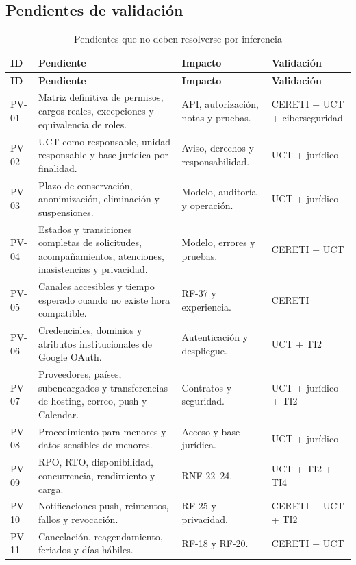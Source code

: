 \documentclass[10pt,a4paper,oneside]{article}
\begin{document}
\subsection{Pendientes de validación}

\scriptsize
\begin{longtable}{@{}L{0.07\textwidth}L{0.40\textwidth}L{0.24\textwidth}L{0.20\textwidth}@{}}
\caption{Pendientes que no deben resolverse por inferencia}\label{tab:pend-sintesis}\\
\toprule\textbf{ID} & \textbf{Pendiente} & \textbf{Impacto} & \textbf{Validación}\\\midrule
\endfirsthead\toprule\textbf{ID} & \textbf{Pendiente} & \textbf{Impacto} & \textbf{Validación}\\\midrule\endhead
\bottomrule\endfoot
PV-01 & Matriz definitiva de permisos, cargos reales, excepciones y equivalencia de roles. & API, autorización, notas y pruebas. & CERETI + UCT + ciberseguridad\\
PV-02 & UCT como responsable, unidad responsable y base jurídica por finalidad. & Aviso, derechos y responsabilidad. & UCT + jurídico\\
PV-03 & Plazo de conservación, anonimización, eliminación y suspensiones. & Modelo, auditoría y operación. & UCT + jurídico\\
PV-04 & Estados y transiciones completas de solicitudes, acompañamientos, atenciones, inasistencias y privacidad. & Modelo, errores y pruebas. & CERETI + UCT\\
PV-05 & Canales accesibles y tiempo esperado cuando no existe hora compatible. & RF-37 y experiencia. & CERETI\\
PV-06 & Credenciales, dominios y atributos institucionales de Google OAuth. & Autenticación y despliegue. & UCT + TI2\\
PV-07 & Proveedores, países, subencargados y transferencias de hosting, correo, push y Calendar. & Contratos y seguridad. & UCT + jurídico + TI2\\
PV-08 & Procedimiento para menores y datos sensibles de menores. & Acceso y base jurídica. & UCT + jurídico\\
PV-09 & RPO, RTO, disponibilidad, concurrencia, rendimiento y carga. & RNF-22--24. & UCT + TI2 + TI4\\
PV-10 & Notificaciones push, reintentos, fallos y revocación. & RF-25 y privacidad. & CERETI + UCT + TI2\\
PV-11 & Cancelación, reagendamiento, feriados y días hábiles. & RF-18 y RF-20. & CERETI + UCT\\

\end{longtable}
\end{document}
